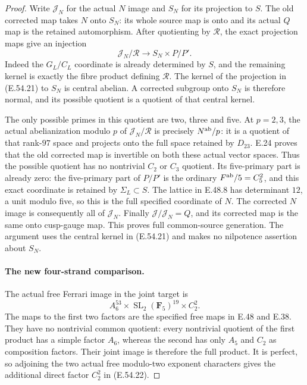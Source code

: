 \begin{proof}
Write $\mathcal J_N$ for the actual $N$ image and $S_N$
for its projection to $S$.  The old corrected map takes
$N$ onto $S_N$: its whole source map is onto and its
actual $Q$ map is the retained automorphism.
After quotienting by $\mathcal R$, the exact projection
maps give an injection
\[
       \mathcal J_N/\mathcal R
                     \longrightarrow S_N\times P/P'.
 \tag{E.54.21}
\]
Indeed the $G_L/C_L$ coordinate is already determined
by $S$, and the remaining kernel is exactly the fibre
product defining $\mathcal R$.
The kernel of the projection in \textup{(E.54.21)} to
$S_N$ is central abelian.  A corrected subgroup onto
$S_N$ is therefore normal, and its possible quotient
is a quotient of that central kernel.

The only possible primes in this quotient are two, three
and five.  At $p=2,3$, the actual abelianization modulo
$p$ of $\mathcal J_N/\mathcal R$ is precisely
$N^{\rm ab}/p$: it is a quotient of that rank-$97$
space and projects onto the full space retained by
$D_{23}$.  E.24 proves that the old corrected map is
invertible on both these actual vector spaces.  Thus
the possible quotient has no nontrivial $C_2$ or $C_3$
quotient.  Its five-primary part is already zero:
the five-primary part of $P/P'$ is the ordinary
$F^{\rm ab}/5=C_5^2$, and this exact coordinate is
retained by $\Sigma_L\subset S$.  The lattice in
E.48.8 has determinant $12$, a unit modulo five,
so this is the full specified coordinate of $N$.
The corrected $N$ image is consequently all of
$\mathcal J_N$.  Finally $\mathcal J/\mathcal J_N=Q$,
and its corrected map is the same onto cusp-gauge
map.  This proves full common-source generation.
The argument uses the central kernel in
\textup{(E.54.21)} and makes no nilpotence assertion
about $S_N$.

\paragraph{The new four-strand comparison.}
The actual free Ferrari image in the joint target is
\[
              A_6^{53}\times
                 \operatorname{SL}_2(\mathbf F_5)^{19}
                         \times C_2^2.
 \tag{E.54.22}
\]
The maps to the first two factors are the specified free
maps in E.48 and E.38.  They have no nontrivial common
quotient: every nontrivial quotient of the first product
has a simple factor $A_6$, whereas the second has only
$A_5$ and $C_2$ as composition factors.  Their joint image
is therefore the full product.  It is perfect, so adjoining
the two actual free modulo-two exponent characters gives
the additional direct factor $C_2^2$ in
\textup{(E.54.22)}.


\end{proof}
